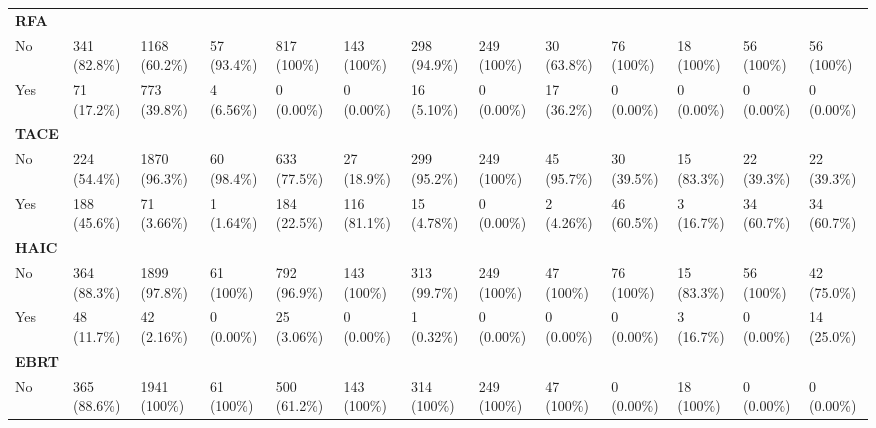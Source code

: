 \documentclass{article}
\begin{document}
\begin{landscape}
\begin{tiny}
\begin{tabularx}{\linewidth}{p{4.5cm}|X|X|X|X|X|X|X|X|X|X|X|X}
\textbf{RFA }  &  &  &  &  &  &  &  &  &  &  &  &  \\
\rowcolor{gray!10}
    No &   341 (82.8\%)    &   1168 (60.2\%)   &    57 (93.4\%)    &    817 (100\%)    &    143 (100\%)    &   298 (94.9\%)    &    249 (100\%)    &    30 (63.8\%)    &    76 (100\%)     &    18 (100\%)     &    56 (100\%)     &    56 (100\%)     \\
\rowcolor{gray!10}
    Yes &    71 (17.2\%)    &   773 (39.8\%)    &    4 (6.56\%)     &    0 (0.00\%)     &    0 (0.00\%)     &    16 (5.10\%)    &    0 (0.00\%)     &    17 (36.2\%)    &    0 (0.00\%)     &    0 (0.00\%)     &    0 (0.00\%)     &    0 (0.00\%)     \\
\rowcolor{gray!30}
\textbf{TACE }  &  &  &  &  &  &  &  &  &  &  &  &  \\
\rowcolor{gray!10}
    No &   224 (54.4\%)    &   1870 (96.3\%)   &    60 (98.4\%)    &   633 (77.5\%)    &    27 (18.9\%)    &   299 (95.2\%)    &    249 (100\%)    &    45 (95.7\%)    &    30 (39.5\%)    &    15 (83.3\%)    &    22 (39.3\%)    &    22 (39.3\%)    \\
\rowcolor{gray!10}
    Yes &   188 (45.6\%)    &    71 (3.66\%)    &    1 (1.64\%)     &   184 (22.5\%)    &   116 (81.1\%)    &    15 (4.78\%)    &    0 (0.00\%)     &    2 (4.26\%)     &    46 (60.5\%)    &    3 (16.7\%)     &    34 (60.7\%)    &    34 (60.7\%)    \\
\rowcolor{gray!30}
\textbf{HAIC }  &  &  &  &  &  &  &  &  &  &  &  &  \\
\rowcolor{gray!10}
    No &   364 (88.3\%)    &   1899 (97.8\%)   &    61 (100\%)     &   792 (96.9\%)    &    143 (100\%)    &   313 (99.7\%)    &    249 (100\%)    &    47 (100\%)     &    76 (100\%)     &    15 (83.3\%)    &    56 (100\%)     &    42 (75.0\%)    \\
\rowcolor{gray!10}
    Yes &    48 (11.7\%)    &    42 (2.16\%)    &    0 (0.00\%)     &    25 (3.06\%)    &    0 (0.00\%)     &    1 (0.32\%)     &    0 (0.00\%)     &    0 (0.00\%)     &    0 (0.00\%)     &    3 (16.7\%)     &    0 (0.00\%)     &    14 (25.0\%)    \\
\rowcolor{gray!30}
\textbf{EBRT }  &  &  &  &  &  &  &  &  &  &  &  &  \\
\rowcolor{gray!10}
    No &   365 (88.6\%)    &   1941 (100\%)    &    61 (100\%)     &   500 (61.2\%)    &    143 (100\%)    &    314 (100\%)    &    249 (100\%)    &    47 (100\%)     &    0 (0.00\%)     &    18 (100\%)     &    0 (0.00\%)     &    0 (0.00\%)     \\

\end{tabularx}
\end{tiny}
\end{landscape}
\end{document}
